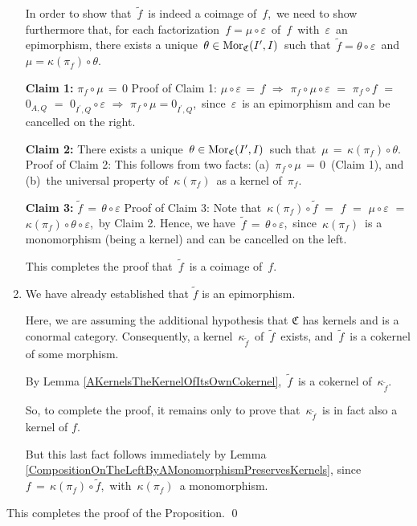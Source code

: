 \begin{enumerate}
	\vskip 0.3cm
	In order to show that \,$\widetilde{f}$\, is indeed a coimage of \,$f$,\,
	we need to show furthermore that, for each factorization \,$f = \mu \circ \varepsilon$\, of \,$f$\,
	with \,$\varepsilon$\, an epimorphism, there exists a unique \,$\theta \in \textnormal{Mor}_{\mathfrak{C}}(I^{\prime},I)$\,
	such that \,$\widetilde{f} = \theta \circ \varepsilon$\, and \,$\mu = \kappa(\pi_{f}) \circ \theta$.

	\vskip 0.3cm
	\noindent
	\textbf{Claim 1:}\;\; $\pi_{f} \circ \mu \,=\, 0$
	\vskip -0.05cm
	\noindent
	Proof of Claim 1:\;
	$\mu \circ \varepsilon \,=\, f$
	\;\;$\Longrightarrow$\;\;
	$\pi_{f} \circ \mu \circ \varepsilon$
	\;$=$\; $\pi_{f} \circ f$
	\;$=$\; $0_{A,Q}$
	\;$=$\; $0_{I^{\prime},Q} \circ \varepsilon$
	\;\;$\Longrightarrow$\;\;
	$\pi_{f} \circ \mu = 0_{I^{\prime},Q}$,\,
	since \,$\varepsilon$\, is an epimorphism and can be cancelled on the right.

	\vskip 0.3cm
	\noindent
	\textbf{Claim 2:}\;\; There exists a unique \,$\theta \in \textnormal{Mor}_{\mathfrak{C}}(I^{\prime},I)$\,
	such that \,$\mu \,=\, \kappa(\pi_{f}) \circ \theta$.\,
	\vskip -0.05cm
	\noindent
	Proof of Claim 2:\;
	This follows from two facts:\;
	(a)	\,$\pi_{f} \circ \mu \,=\, 0$\, (Claim 1), and
	(b)	\,the universal property of \,$\kappa(\pi_{f})$\, as a kernel of \,$\pi_{f}$.\,

	\vskip 0.3cm
	\noindent
	\textbf{Claim 3:}\;\; $\widetilde{f} \,=\, \theta \circ \varepsilon$
	\vskip -0.05cm
	\noindent
	Proof of Claim 3:\; Note that
	\,$\kappa(\pi_{f}) \circ \widetilde{f}$
	\;$=$\; $f$
	\;$=$\; $\mu \circ \varepsilon$
	\;$=$\; $\kappa(\pi_{f}) \circ \theta \circ \varepsilon$,\, by Claim 2.
	Hence, we have
	\,$\widetilde{f} \,=\, \theta \circ \varepsilon$,\,
	since \,$\kappa(\pi_{f})$\, is a monomorphism (being a kernel)
	and can be cancelled on the left.
	
	\vskip 0.3cm
	\noindent
	This completes the proof that \,$\widetilde{f}$\, is a coimage of \,$f$.

\item
	We have already established that $\widetilde{f}$ is an epimorphism.
	
	Here, we are assuming the additional hypothesis that
	$\mathfrak{C}$ {\color{red}has kernels} and is a {\color{red}conormal} category.
	Consequently, a kernel \,$\kappa_{\widetilde{f}}$\, of \,$\widetilde{f}$\, exists, and
	\,$\widetilde{f}$\, is a cokernel of some morphism.
	
	By Lemma \ref{AKernelsTheKernelOfItsOwnCokernel},
	\,$\widetilde{f}$\, is a cokernel of \,$\kappa_{\widetilde{f}}$.
	
	So, to complete the proof, it remains only to prove that \,$\kappa_{\widetilde{f}}$\, is in fact also a kernel of $f$.
	
	But this last fact follows immediately by Lemma \ref{CompositionOnTheLeftByAMonomorphismPreservesKernels},
	since \,$f \,=\, \kappa(\pi_{f}) \circ \widetilde{f}$,\, with \,$\kappa(\pi_{f})$\, a monomorphism.
\end{enumerate}
\vskip 0.3cm
This completes the proof of the Proposition.
\qed

